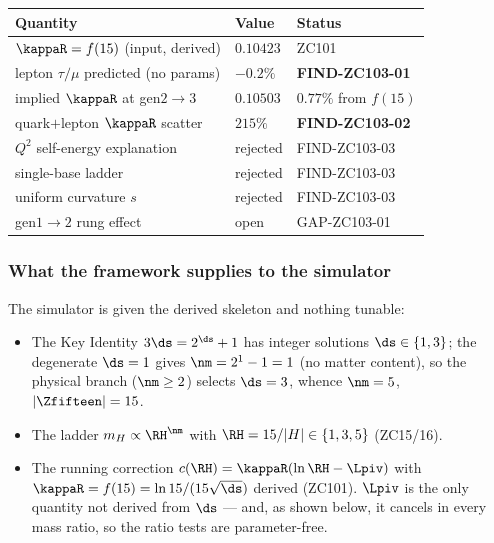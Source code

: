 \documentclass[12pt, a4paper]{article}
\begin{document}
\begin{keybox}[title={Numerical Summary --- ZC103 (T-canonical)}]
{\small\renewcommand{\arraystretch}{1.25}
\begin{center}
\begin{tabular}{@{}p{6.2cm}p{2.8cm}p{3.4cm}@{}}
\toprule
\textbf{Quantity} & \textbf{Value} & \textbf{Status} \\
\midrule
$\kappaR=f(15)$ (input, derived)        & $0.10423$  & ZC101 \\
lepton $\tau/\mu$ predicted (no params) & $-0.2\%$   & \textbf{FIND-ZC103-01} \\
implied $\kappaR$ at gen$2{\to}3$       & $0.10503$  & $0.77\%$ from $f(15)$ \\
quark$+$lepton $\kappaR$ scatter        & $215\%$    & \textbf{FIND-ZC103-02} \\
$Q^2$ self-energy explanation           & rejected   & FIND-ZC103-03 \\
single-base ladder                       & rejected   & FIND-ZC103-03 \\
uniform curvature $s$                     & rejected   & FIND-ZC103-03 \\
gen$1{\to}2$ rung effect                  & open       & GAP-ZC103-01 \\
\bottomrule
\end{tabular}
\end{center}}
\end{keybox}

\subsubsection{What the framework supplies to the simulator}

The simulator is given the derived skeleton and nothing tunable:
\begin{itemize}[leftmargin=2em, noitemsep]
  \item The Key Identity $3\ds=2^{\ds}+1$ has integer solutions $\ds\in\{1,3\}$;
    the degenerate $\ds=1$ gives $\nm=2^1-1=1$ (no matter content), so the
    physical branch ($\nm\ge2$) selects $\ds=3$, whence $\nm=5$, $|\Zfifteen|=15$.
  \item The ladder $m_H\propto\RH^{\nm}$ with $\RH=15/|H|\in\{1,3,5\}$ (ZC15/16).
  \item The running correction $c(\RH)=\kappaR(\ln\RH-\Lpiv)$ with
    $\kappaR=f(15)=\ln 15/(15\sqrt{\ds})$ derived (ZC101). $\Lpiv$ is the only
    quantity not derived from $\ds$ --- and, as shown below, it cancels in every
    mass ratio, so the ratio tests are parameter-free.
\end{itemize}
\end{document}
